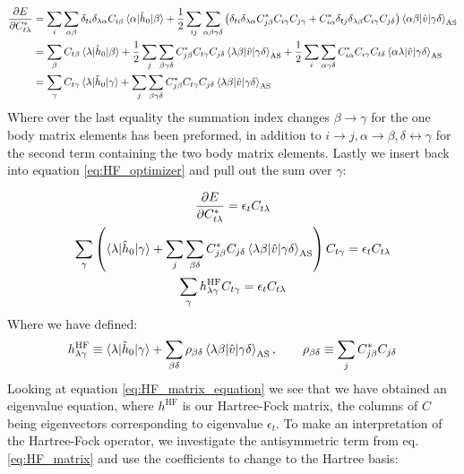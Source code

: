 \documentclass{article}
\newcommand{\inner}[3]{\braket{#1|#2|#3}}
\newcommand{\innerAS}[3]{\inner{#1}{#2}{#3}_{\text{AS}}}
\newcommand{\hnull}{\hat{h}_0}
\newcommand{\hafo}[1]{#1^{\text{HF}}}
\begin{document}
    \begin{align*}
        \pdv{E}{C^*_{t\lambda}} &= \sum_{i}\sum_{\alpha\beta} \delta_{ti}\delta_{\lambda\alpha} C_{i\beta} \inner{\alpha}{\hnull}{\beta} + \frac{1}{2}\sum_{ij}\sum_{\alpha\beta\gamma\delta} \left( \delta_{ti}\delta_{\lambda\alpha}C^*_{j\beta}C_{i\gamma}C_{j\gamma} + C^*_{i\alpha} \delta_{tj}\delta_{\lambda\beta} C_{i\gamma}C_{j\delta} \right) \innerAS{\alpha\beta}{\hat{v}}{\gamma\delta} \\
        &= \sum_{\beta} C_{t\beta} \inner{\lambda}{\hnull}{\beta} + \frac{1}{2}\sum_j \sum_{\beta\gamma\delta} C^*_{j\beta} C_{t\gamma} C_{j\delta} \innerAS{\lambda\beta}{\hat{v}}{\gamma\delta} + \frac{1}{2} \sum_i \sum_{\alpha\gamma\delta} C^*_{i\alpha} C_{i\gamma} C_{t\delta} \innerAS{\alpha\lambda}{\hat{v}}{\gamma\delta} \\
        &= \sum_\gamma C_{t\gamma} \inner{\lambda}{\hnull}{\gamma} + \sum_j \sum_{\beta\gamma\delta} C^*_{j\beta} C_{t\gamma} C_{j\delta} \innerAS{\lambda\beta}{\hat{v}}{\gamma\delta}
    \end{align*}
    Where over the last equality the summation index changes $\beta \rightarrow \gamma$ for the one body matrix elements has been preformed, in addition to $i \rightarrow j, \alpha \rightarrow \beta, \delta \leftrightarrow \gamma$ for the second term containing the two body matrix elements. Lastly we insert back into equation \eqref{eq:HF_optimizer} and pull out the sum over $\gamma$:

    \begin{gather}
        \pdv{E}{C^*_{t\lambda}} = \epsilon_t C_{t\lambda} \nonumber \\
        \sum_\gamma \left(\inner{\lambda}{\hnull}{\gamma} + \sum_j \sum_{\beta\delta} C^*_{j\beta} C_{j\delta} \innerAS{\lambda\beta}{\hat{v}}{\gamma\delta}\right)C_{t\gamma} = \epsilon_t C_{t\lambda} \nonumber\\
        \sum_{\gamma} \hafo{h_{\lambda\gamma}} C_{t\gamma} = \epsilon_t C_{t\lambda} \label{eq:HF_matrix_equation}
    \end{gather}
    Where we have defined:
    \begin{align}
        \hafo{h_{\lambda\gamma}} \equiv \inner{\lambda}{\hnull}{\gamma} + \sum_{\beta\delta} \rho_{\beta\delta} \innerAS{\lambda\beta}{\hat{v}}{\gamma\delta},\hspace{20px}\rho_{\beta \delta} \equiv \sum_j C^*_{j\beta} C_{j\delta} \label{eq:HF_matrix}
    \end{align}
    Looking at equation \eqref{eq:HF_matrix_equation} we see that we have obtained an eigenvalue equation, where $\hafo{h}$ is our Hartree-Fock matrix, the columns of $C$ being eigenvectors corresponding to eigenvalue $\epsilon_t$. To make an interpretation of the Hartree-Fock operator,
    we investigate the antisymmetric term from eq. \eqref{eq:HF_matrix} and use the coefficients to change to the Hartree basis:
    
\end{document}
